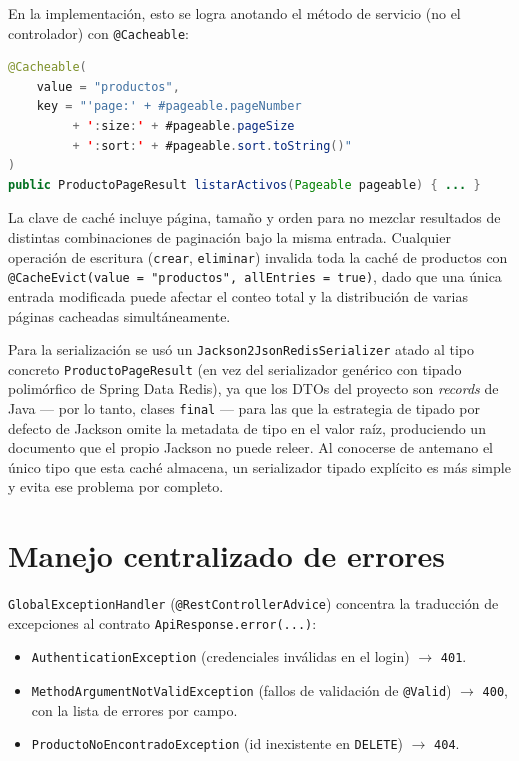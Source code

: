 \documentclass[11pt,a4paper]{article}
\begin{document}
En la implementación, esto se logra anotando el método de servicio (no el
controlador) con \texttt{@Cacheable}:

\begin{lstlisting}[language=java]
@Cacheable(
    value = "productos",
    key = "'page:' + #pageable.pageNumber
         + ':size:' + #pageable.pageSize
         + ':sort:' + #pageable.sort.toString()"
)
public ProductoPageResult listarActivos(Pageable pageable) { ... }
\end{lstlisting}

La clave de caché incluye página, tamaño y orden para no mezclar resultados de
distintas combinaciones de paginación bajo la misma entrada. Cualquier
operación de escritura (\texttt{crear}, \texttt{eliminar}) invalida toda la
caché de productos con \texttt{@CacheEvict(value = "productos", allEntries =
true)}, dado que una única entrada modificada puede afectar el conteo total y
la distribución de varias páginas cacheadas simultáneamente.

Para la serialización se usó un \texttt{Jackson2JsonRedisSerializer} atado al
tipo concreto \texttt{ProductoPageResult} (en vez del serializador genérico con
tipado polimórfico de Spring Data Redis), ya que los DTOs del proyecto son
\emph{records} de Java --- por lo tanto, clases \texttt{final} --- para las que
la estrategia de tipado por defecto de Jackson omite la metadata de tipo en el
valor raíz, produciendo un documento que el propio Jackson no puede releer. Al
conocerse de antemano el único tipo que esta caché almacena, un serializador
tipado explícito es más simple y evita ese problema por completo.

\section{Manejo centralizado de errores}

\texttt{GlobalExceptionHandler} (\texttt{@RestControllerAdvice}) concentra la
traducción de excepciones al contrato \texttt{ApiResponse.error(...)}:

\begin{itemize}[noitemsep]
    \item \texttt{AuthenticationException} (credenciales inválidas en el
        login) $\rightarrow$ \texttt{401}.
    \item \texttt{MethodArgumentNotValidException} (fallos de validación de
        \texttt{@Valid}) $\rightarrow$ \texttt{400}, con la lista de errores
        por campo.
    \item \texttt{ProductoNoEncontradoException} (id inexistente en
        \texttt{DELETE}) $\rightarrow$ \texttt{404}.
\end{itemize}
\end{document}
